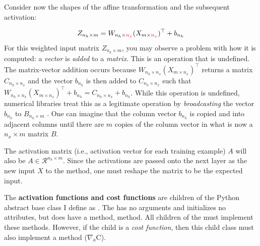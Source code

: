\documentclass{article}
\begin{document}
Consider now the shapes of the affine transformation and the subsequent activation:

\begin{align}
	Z_{n_h \times m} =
	W_{n_h \times \begingroup\color{red}n_x\endgroup} (X_{m \times \begingroup\color{red}n_x\endgroup})^{\top} + b_{n_h}
\end{align}
For this weighted input matrix $Z_{n_h \times m}$, you may observe a problem with how
it is computed:
a \textit{vector} is \textit{added} to a \textit{matrix}. This is an operation that is undefined.
The matrix-vector addition occurs because $W_{n_h \times n_x}(X_{m \times n_x})^\top$
returns a matrix $C_{n_h \times n_x}$ and the vector $b_{n_h}$ is then added
to $C_{n_h \times n_x}$ such that
$W_{n_h \times n_x}(X_{m \times n_x})^\top + b_{n_h} = C_{n_h \times n_x} + b_{n_h}$.
While this operation is undefined, numerical libraries treat this as a legitimate
operation by \textit{broadcasting} the vector $b_{n_h}$ to $B_{n_h \times m}$ \cite{Goodfellow2016,NumPyBroadcasting2021}.
One can imagine that the column vector $b_{n_h}$ is copied and
into adjacent columns until there are $m$ copies of the column vector in
what is now a $n_x \times m$ matrix $B$.

The activation matrix (i.e., activation vector for each training example) $A$
will also be $A \in \mathcal{R}^{n_h \times m}$. Since the activations are
passed onto the next layer as the new input $X$ to the  method,
one must reshape the matrix to be the expected input.

The \textbf{activation functions and cost functions} are children of the Python
abstract base class I define as . The
 has no arguments and initializes no attributes, but
does have a  method,  method. All
children of the  must implement these methods. However, if
the child is a \textit{cost function}, then this child class must also
implement a  method ($\nabla_{a}\text{C}$).

\pagebreak
\printbibliography
\end{document}
